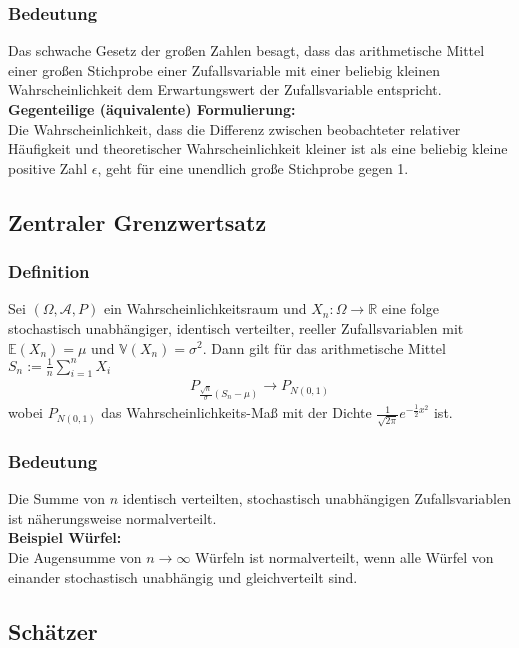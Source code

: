 \documentclass[a4paper]{article}
\begin{document}
\subsubsection{Bedeutung}
Das schwache Gesetz der großen Zahlen besagt, dass das arithmetische Mittel einer großen Stichprobe einer Zufallsvariable mit einer beliebig kleinen Wahrscheinlichkeit dem Erwartungswert der Zufallsvariable entspricht.\\

\textbf{Gegenteilige (äquivalente) Formulierung:}\\
Die Wahrscheinlichkeit, dass die Differenz zwischen beobachteter relativer Häufigkeit und theoretischer Wahrscheinlichkeit kleiner ist als eine beliebig kleine positive Zahl $\epsilon$, geht für eine unendlich große Stichprobe gegen 1.


\subsection{Zentraler Grenzwertsatz}

\subsubsection{Definition}
Sei $(\Omega, \mathcal{A}, P)$ ein Wahrscheinlichkeitsraum und $X_n :  \Omega \to \mathbb{R}$  eine folge stochastisch unabhängiger, identisch verteilter, reeller Zufallsvariablen mit $\mathbb{E}(X_n) = \mu$ und $\mathbb{V}(X_n)= \sigma^2$. Dann gilt für das arithmetische Mittel $S_n:= \frac{1}{n} \sum_{i=1}^n X_i$
\begin{align*}
P_{ \frac{\sqrt{n}}{\sigma} (S_n-\mu)} \to P_{N(0,1)}
\end{align*}
wobei $ P_{N(0,1)}$ das Wahrscheinlichkeits-Maß mit der Dichte $ \frac {1}{ \sqrt{2\pi}}e^{- \frac {1}{2} x^2}$ ist.
\subsubsection{Bedeutung}
Die Summe von $n$ identisch verteilten, stochastisch unabhängigen Zufallsvariablen ist näherungsweise normalverteilt.\\

\textbf{Beispiel Würfel:}\\
Die Augensumme von $n \to \infty$ Würfeln ist normalverteilt, wenn alle Würfel von einander stochastisch unabhängig und gleichverteilt sind.


\subsection{Schätzer}
\end{document}
